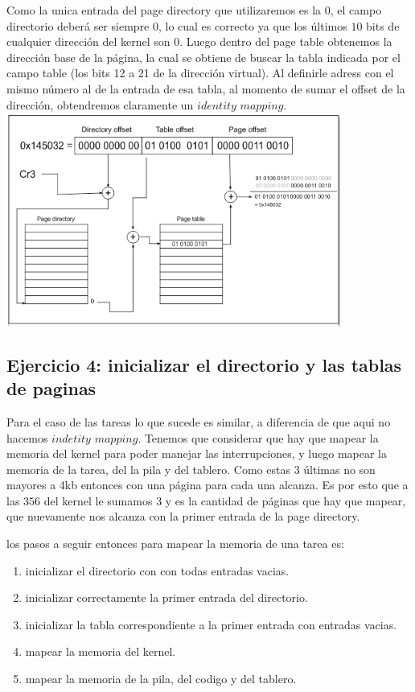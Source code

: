\documentclass[a4paper,10pt,twoside]{article}
\begin{document}
Como la unica entrada del page directory que utilizaremos es la $0$, el campo directorio deberá ser siempre $0$, lo cual es correcto ya que los últimos $10$ bits de cualquier dirección del kernel son $0$. Luego dentro del page table obtenemos la dirección base de la página, la cual se obtiene de buscar la tabla indicada por el campo table (los bits 12 a 21 de la dirección virtual). Al definirle adress con el mismo número al de la entrada de esa tabla, al momento de sumar el offset de la dirección, obtendremos claramente un $identity$ $mapping$. \\

\includegraphics[height=7cm]{iddMap.png}

\subsection{Ejercicio 4: inicializar el directorio y las tablas de paginas}

Para el caso de las tareas lo que sucede es similar, a diferencia de que aqui no hacemos $indetity$ $mapping$. 
Tenemos que considerar que hay que mapear la memoria del kernel para poder manejar las interrupciones, y luego mapear la memoria de la tarea, del la pila y del tablero. Como estas $3$ últimas no son mayores a 4kb entonces con una página para cada una alcanza. Es por esto que a las $356$ del kernel le sumamos $3$ y es la cantidad de páginas que hay que mapear, que nuevamente nos alcanza con la primer entrada de la page directory.

los pasos a seguir entonces para mapear la memoria de una tarea es:

\begin{enumerate}
 \item inicializar el directorio con con todas entradas vacias.
 \item inicializar correctamente la primer entrada del directorio.
 \item inicializar la tabla correspondiente a la primer entrada con entradas vacias.
 \item mapear la memoria del kernel.
 \item mapear la memoria de la pila, del codigo y del tablero.
\end{enumerate}
\end{document}
